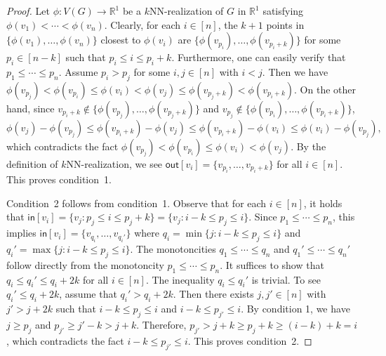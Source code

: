 \begin{proof}
Let $\phi:V(G) \rightarrow \mathbb{R}^1$ be a $k$NN-realization of $G$ in $\mathbb{R}^1$ satisfying $\phi(v_1) < \cdots < \phi(v_n)$.
Clearly, for each $i \in [n]$, the $k+1$ points in $\{\phi(v_1),\dots,\phi(v_n)\}$ closest to $\phi(v_i)$ are $\{\phi(v_{p_i}),\dots,\phi(v_{p_i+k})\}$ for some $p_i \in [n-k]$ such that $p_i \leq i \leq p_i+k$.
Furthermore, one can easily verify that $p_1 \leq \cdots \leq p_n$.
Assume $p_i > p_j$ for some $i,j \in [n]$ with $i<j$.
Then we have $\phi(v_{p_j}) < \phi(v_{p_i}) \leq \phi(v_i) < \phi(v_j) \leq \phi(v_{p_j+k}) < \phi(v_{p_i+k})$.
On the other hand, since $v_{p_i+k} \notin \{\phi(v_{p_j}),\dots,\phi(v_{p_j+k})\}$ and $v_{p_j} \notin \{\phi(v_{p_i}),\dots,\phi(v_{p_i+k})\}$,
\begin{equation*}
    \phi(v_j) - \phi(v_{p_j}) \leq \phi(v_{p_i+k}) - \phi(v_j) \leq \phi(v_{p_i+k}) - \phi(v_i) \leq \phi(v_i) - \phi(v_{p_j}),
\end{equation*}
which contradicts the fact $\phi(v_{p_j}) < \phi(v_{p_i}) \leq \phi(v_i) < \phi(v_j)$.
By the definition of $k$NN-realization, we see $\mathsf{out}[v_i] = \{v_{p_i},\dots,v_{p_i+k}\}$ for all $i \in [n]$.
This proves condition~1.

Condition~2 follows from condition~1.
Observe that for each $i \in [n]$, it holds that $\mathsf{in}[v_i] = \{v_j: p_j \leq i \leq p_j+k \} = \{v_j: i-k \leq p_j \leq i\}$.
Since $p_1 \leq \cdots \leq p_n$, this implies $\mathsf{in}[v_i] = \{v_{q_i},\dots,v_{q_i'}\}$ where $q_i = \min\{j: i-k \leq p_j \leq i\}$ and $q_i' = \max\{j: i-k \leq p_j \leq i\}$.
The monotoncities $q_1 \leq \cdots \leq q_n$ and $q_1' \leq \cdots \leq q_n'$ follow directly from the monotoncity $p_1 \leq \cdots \leq p_n$.
It suffices to show that $q_i \leq q_i' \leq q_i+2k$ for all $i \in [n]$.
The inequality $q_i \leq q_i'$ is trivial.
To see $q_i' \leq q_i+2k$, assume that $q_i' > q_i+2k$.
Then there exists $j,j' \in [n]$ with $j' > j+2k$ such that $i-k \leq p_j \leq i$ and $i-k \leq p_{j'} \leq i$.
By condition 1, we have $j \geq p_j$ and $p_{j'} \geq j' - k > j+k$.
Therefore, $p_{j'} > j+k \geq p_j+k \geq (i-k)+k = i$, which contradicts the fact $i-k \leq p_{j'} \leq i$.
This proves condition~2.
\end{proof}

